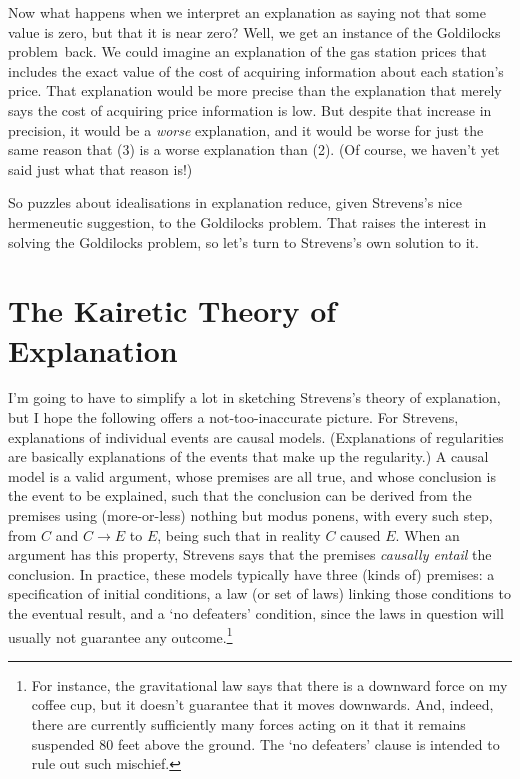 Now what happens when we interpret an explanation as saying not that some value is zero, but that it is near zero? Well, we get an instance of the Goldilocks problem\ back. We could imagine an explanation of the gas station prices that includes the exact value of the cost of acquiring information about each station's price. That explanation would be more precise than the explanation that merely says the cost of acquiring price information is low. But despite that increase in precision, it would be a \textit{worse} explanation, and it would be worse for just the same reason that (3) is a worse explanation than (2). (Of course, we haven't yet said just what that reason is!)

So puzzles about idealisations in explanation reduce, given Strevens's nice hermeneutic suggestion, to the Goldilocks problem. That raises the interest in solving the Goldilocks problem, so let's turn to Strevens's own solution to it.

\section{The Kairetic Theory of Explanation}

I'm going to have to simplify a lot in sketching Strevens's theory of explanation, but I hope the following offers a not-too-inaccurate picture. For Strevens, explanations of individual events are causal models. (Explanations of regularities are basically explanations of the events that make up the regularity.) A causal model is a valid argument, whose premises are all true, and whose conclusion is the event to be explained, such that the conclusion can be derived from the premises using (more-or-less) nothing but modus ponens, with every such step, from $C$ and $C \rightarrow E$ to $E$, being such that in reality $C$ caused $E$. When an argument has this property, Strevens says that the premises \textit{causally entail} the conclusion. In practice, these models typically have three (kinds of) premises: a specification of initial conditions, a law (or set of laws) linking those conditions to the eventual result, and a `no defeaters' condition, since the laws in question will usually not guarantee any outcome.\footnote{For instance, the gravitational law says that there is a downward force on my coffee cup, but it doesn't guarantee that it moves downwards. And, indeed, there are currently sufficiently many forces acting on it that it remains suspended 80 feet above the ground. The `no defeaters' clause is intended to rule out such mischief.}

